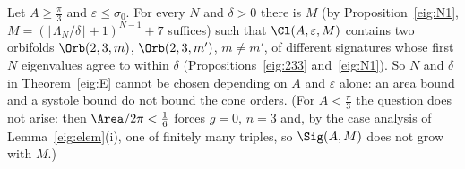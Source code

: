 \begin{remark}\label{eig:Mneeded}
Let $A\ge\frac\pi3$ and $\varepsilon\le\sigma_0$. For every $N$ and $\delta>0$ there is $M$ (by Proposition~\ref{eig:N1}, $M=(\lfloor\Lambda_N/\delta\rfloor+1)^{N-1}+7$ suffices) such that $\Cl(A,\varepsilon,M)$ contains two orbifolds $\Orb(2,3,m)$, $\Orb(2,3,m')$, $m\ne m'$, of different signatures whose first $N$ eigenvalues agree to within $\delta$ (Propositions~\ref{eig:233} and~\ref{eig:N1}). So $N$ and $\delta$ in Theorem~\ref{eig:E} cannot be chosen depending on $A$ and $\varepsilon$ alone: an area bound and a systole bound do not bound the cone orders. (For $A<\frac\pi3$ the question does not arise: then $\Area/2\pi<\frac16$ forces $g=0$, $n=3$ and, by the case analysis of Lemma~\ref{eig:elem}(i), one of finitely many triples, so $\Sig(A,M)$ does not grow with $M$.)
\end{remark}
